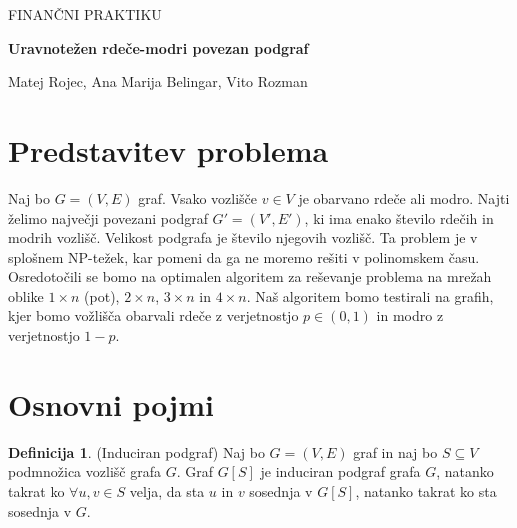 \documentclass[a4paper, 11pt]{article}
\theoremstyle{definition}
\newtheorem{definicija}{Definicija}
\theoremstyle{definition}
\begin{document}
    \begin{titlepage}
        \begin{center}
            \vspace*{1cm}
            
            \LARGE
            FINANČNI PRAKTIKU
                
            \vspace{1cm}
            \huge
            \textbf{Uravnotežen rdeče-modri povezan podgraf}
                
            \vspace{1cm}
                
            \Large   
            Matej Rojec, Ana Marija Belingar, Vito Rozman 
        
            
            \vspace{2cm}
    
                
                    
        \end{center}
    \end{titlepage}

    \section{Predstavitev problema}
        
    Naj bo $G = (V, E)$ graf. Vsako vozlišče $v \in V $ je obarvano rdeče ali modro. 
    Najti želimo največji povezani podgraf $G' = (V', E')$, ki ima enako število rdečih in modrih vozlišč.
    Velikost podgrafa je število njegovih vozlišč. Ta problem je v splošnem NP-težek, kar pomeni da ga ne moremo
    rešiti v polinomskem času.
    Osredotočili se bomo na optimalen algoritem za reševanje problema na mrežah oblike $1 \times n$ (pot), $2 \times n$, 
    $3 \times n$ in $4 \times n$.
    Naš algoritem bomo testirali na grafih, kjer bomo vožlišča obarvali rdeče z verjetnostjo $p \in (0,1)$ 
    in modro z verjetnostjo $1 - p$. 
    

    \section{Osnovni pojmi}
    
    \begin{definicija} (Induciran podgraf)
        Naj bo $G=(V,E)$ graf in naj bo $S \subseteq V$ podmnožica vozlišč grafa $G$. 
        Graf $G[S]$ je induciran podgraf grafa $G$, natanko takrat ko $\forall u, v \in S$ velja,
        da sta $u$ in $v$ sosednja v $G[S]$, natanko takrat ko sta sosednja v $G$.
    \end{definicija}
    
\end{document}
